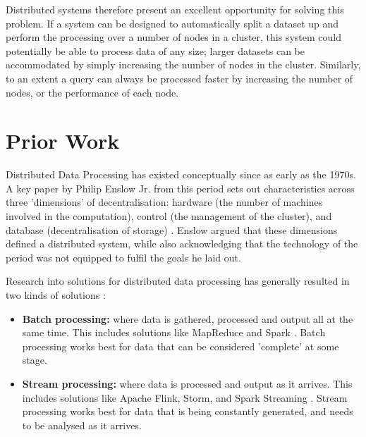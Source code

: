 Distributed systems therefore present an excellent opportunity for solving this problem. If a system can be designed to automatically split a dataset up and perform the processing over a number of nodes in a cluster, this system could potentially be able to process data of any size; larger datasets can be accommodated by simply increasing the number of nodes in the cluster. Similarly, to an extent a query can always be processed faster by increasing the number of nodes, or the performance of each node.


\section{Prior Work}
Distributed Data Processing has existed conceptually since as early as the 1970s. A key paper by Philip Enslow Jr{\frenchspacing.} from this period sets out characteristics across three 'dimensions' of decentralisation: hardware (the number of machines involved in the computation), control (the management of the cluster), and database (decentralisation of storage) \cite{enslow1978distributed}. Enslow argued that these dimensions defined a distributed system, while also acknowledging that the technology of the period was not equipped to fulfil the goals he laid out.

Research into solutions for distributed data processing has generally resulted in two kinds of solutions \cite{yaqoob2016big}:
\begin{itemize}
	\item \textbf{Batch processing:} where data is gathered, processed and output all at the same time. This includes solutions like MapReduce and Spark  \cite{dean2008mapreduce, zaharia2016spark}. Batch processing works best for data that can be considered 'complete' at some stage.
	\item \textbf{Stream processing:} where data is processed and output as it arrives. This includes solutions like Apache Flink, Storm, and Spark Streaming \cite{carbone2015flink, toshniwal2014storm, armbrust2018sparkstreaming}. Stream processing works best for data that is being constantly generated, and needs to be analysed as it arrives.
\end{itemize}

